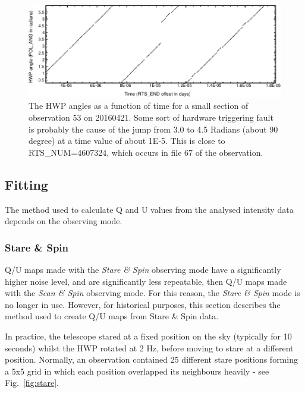 \documentclass[twoside,11pt]{starlink}
\begin{document}
\begin{figure}
\includegraphics[width=\columnwidth]{polang}
\caption{The HWP angles as a function of time for a small section of
observation 53 on 20160421. Some sort of hardware triggering fault is
probably the cause of the jump from 3.0 to 4.5 Radians (about 90
degree) at a time value of about 1E-5. This is close to RTS\_NUM=4607324,
which occurs in file 67 of the observation.}
\label{fig:polang}
\end{figure}

\subsection{Fitting}
The method used to calculate Q and U values from the  analysed intensity
data depends on the observing mode.

\subsubsection{Stare \& Spin}
Q/U maps made with the \emph{Stare \& Spin} observing mode have a
significantly higher noise level, and are significantly less repeatable,
then Q/U maps made with the \emph{Scan \& Spin} observing mode. For this
reason, the \emph{Stare \& Spin} mode is no longer in use. However, for
historical purposes, this section describes the method used to create Q/U
maps from Stare \& Spin data.

In practice, the telescope stared at a fixed position on the sky
(typically for 10 seconds) whilst the HWP rotated at 2 Hz, before moving
to stare at a different position. Normally, an observation contained 25
different stare positions forming a 5x5 grid in which each position
overlapped its neighbours heavily - see Fig.~\ref{fig:stare}.
\end{document}
